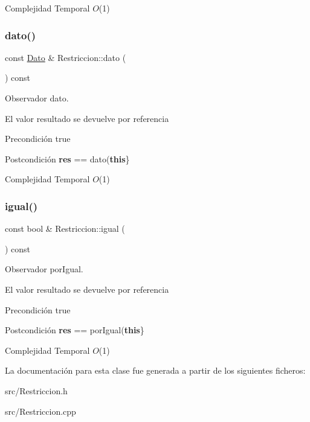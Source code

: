 \begin{DoxyDescription}
\item[Complejidad Temporal]$O$(1)
\end{DoxyDescription}\mbox{\label{classRestriccion_a54b0ae0865a0a3eee152931e22b8b7f8}} 
\subsubsection{\texorpdfstring{dato()}{dato()}}
{\footnotesize\ttfamily const \mbox{\hyperlink{classDato}{Dato}} \& Restriccion\+::dato (\begin{DoxyParamCaption}{ }\end{DoxyParamCaption}) const}



Observador dato. 

El valor resultado se devuelve por referencia

\begin{DoxyPrecond}{Precondición}
true 
\end{DoxyPrecond}
\begin{DoxyPostcond}{Postcondición}
{\bfseries res} == dato({\bfseries this}\}
\end{DoxyPostcond}

\begin{DoxyDescription}
\item[Complejidad Temporal]$O$(1)
\end{DoxyDescription}\mbox{\label{classRestriccion_a00cadade77b720aeefb909b879d01647}} 
\subsubsection{\texorpdfstring{igual()}{igual()}}
{\footnotesize\ttfamily const bool \& Restriccion\+::igual (\begin{DoxyParamCaption}{ }\end{DoxyParamCaption}) const}



Observador por\+Igual. 

El valor resultado se devuelve por referencia

\begin{DoxyPrecond}{Precondición}
true 
\end{DoxyPrecond}
\begin{DoxyPostcond}{Postcondición}
{\bfseries res} == por\+Igual({\bfseries this}\}
\end{DoxyPostcond}

\begin{DoxyDescription}
\item[Complejidad Temporal]$O$(1)
\end{DoxyDescription}

La documentación para esta clase fue generada a partir de los siguientes ficheros\+:\begin{DoxyCompactItemize}
\item 
src/Restriccion.\+h\item 
src/Restriccion.\+cpp\end{DoxyCompactItemize}

